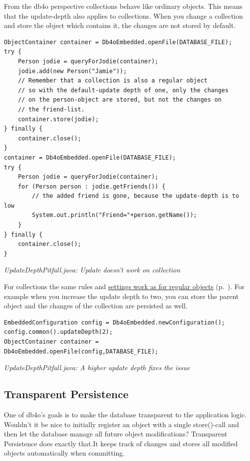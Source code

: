 From the db4o perspective collections behave like ordinary objects. This means that the update-depth also applies to collections. When you change a collection and store the object which contains it, the changes are not stored by default.

\begin{lstlisting}
ObjectContainer container = Db4oEmbedded.openFile(DATABASE_FILE);
try {
    Person jodie = queryForJodie(container);
    jodie.add(new Person("Jamie"));
    // Remember that a collection is also a regular object
    // so with the default-update depth of one, only the changes
    // on the person-object are stored, but not the changes on
    // the friend-list.
    container.store(jodie);
} finally {
    container.close();
}
container = Db4oEmbedded.openFile(DATABASE_FILE);
try {
    Person jodie = queryForJodie(container);
    for (Person person : jodie.getFriends()) {
        // the added friend is gone, because the update-depth is to low
        System.out.println("Friend="+person.getName());
    }
} finally {
    container.close();
}
\end{lstlisting}

{\small\itshape UpdateDepthPitfall.java: Update doesn't work on collection\par}
\medskip

For collections the same rules and \hyperref[ref:basics-update-concept-update-depth-in-action]{settings work as for regular objects} (p.~\pageref{ref:basics-update-concept-update-depth-in-action}). For example when you increase the update depth to two, you can store the parent object and the changes of the collection are persisted as well.

\begin{lstlisting}
EmbeddedConfiguration config = Db4oEmbedded.newConfiguration();
config.common().updateDepth(2);
ObjectContainer container = Db4oEmbedded.openFile(config,DATABASE_FILE);
\end{lstlisting}

{\small\itshape UpdateDepthPitfall.java: A higher update depth fixes the issue\par}
\medskip

\subsection{Transparent Persistence}
\label{ref:basics-update-concept-transparent-persistence}

One of db4o's goals is to make the database transparent to the application logic. Wouldn't it be nice to initially register an object with a single store()-call and then let the database manage all future object modifications? Transparent Persistence does exactly that.It keeps track of changes and stores all modified objects automatically when committing.


